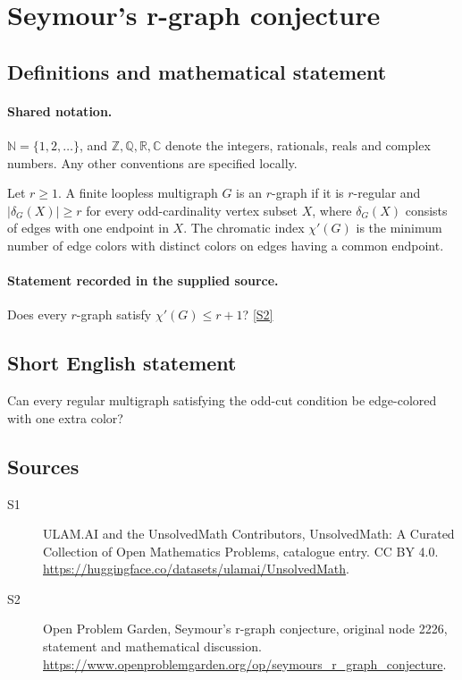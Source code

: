 \documentclass[11pt]{article}
\newcommand{\sref}[2]{\hyperlink{source:#1:#2}{[S#2]}}
\begin{document}
\section{Seymour's r-graph conjecture}\label{statement}

\subsection{Definitions and mathematical statement}

\paragraph{Shared notation.}$\mathbb N=\{1,2,\ldots\}$, and $\mathbb Z,\mathbb Q,\mathbb R,\mathbb C$ denote the integers, rationals, reals and complex numbers. Any other conventions are specified locally.


Let $r\ge1$. A finite loopless multigraph $G$ is an $r$-graph if it is $r$-regular and $|\delta_G(X)|\ge r$ for every odd-cardinality vertex subset $X$, where $\delta_G(X)$ consists of edges with one endpoint in $X$. The chromatic index $\chi'(G)$ is the minimum number of edge colors with distinct colors on edges having a common endpoint.
\paragraph{Statement recorded in the supplied source.}
Does every $r$-graph satisfy $\chi'(G)\le r+1$? \sref{statement}{2}
\subsection{Short English statement}
Can every regular multigraph satisfying the odd-cut condition be edge-colored with one extra color?
\subsection{Sources}
\begin{description}
\item[\hypertarget{source:statement:1}{S1}] ULAM.AI and the UnsolvedMath Contributors, UnsolvedMath: A Curated Collection of Open Mathematics Problems, catalogue entry. CC BY 4.0. \url{https://huggingface.co/datasets/ulamai/UnsolvedMath}.
\item[\hypertarget{source:statement:2}{S2}] Open Problem Garden, Seymour's r-graph conjecture, original node 2226, statement and mathematical discussion. \url{https://www.openproblemgarden.org/op/seymours_r_graph_conjecture}.
\end{description}
\label{end:statement}
\end{document}
